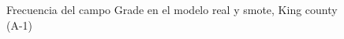 \begin{figure}[H]
    \centering
    
    \caption{Frecuencia del campo Grade en el modelo real y smote, King county (A-1)}
    \label{frecuency-smote-grade}
\end{figure}